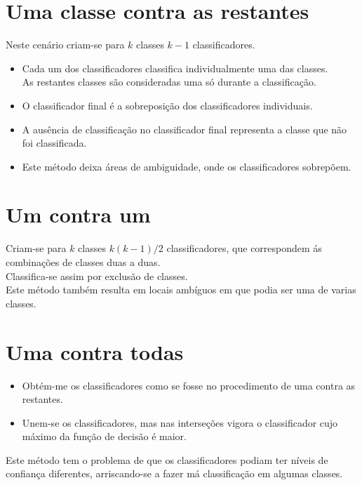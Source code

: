 \documentclass[]{report}
\begin{document}
\section{Uma classe contra as restantes}
Neste cenário criam-se para $k$ classes $k-1$ classificadores.
\begin{itemize}
\item Cada um dos classificadores classifica individualmente uma das classes.\\
As restantes classes são consideradas uma só durante a classificação.
\item O classificador final é a sobreposição dos classificadores individuais.
\item A ausência de classificação no classificador final representa a classe que não foi classificada.
\item Este método deixa áreas de ambiguidade, onde os classificadores sobrepõem.
\end{itemize}
\section{Um contra um}
Criam-se para $k$ classes $k(k-1)/2$ classificadores, que correspondem ás combinações de classes duas a duas.\\
Classifica-se assim por exclusão de classes.\\
Este método também resulta em locais ambíguos em que podia ser uma de varias classes.
\section{Uma contra todas}
\begin{itemize}
\item Obtém-me os classificadores como se fosse no procedimento de uma contra as restantes.
\item Unem-se os classificadores, mas nas interseções vigora o classificador cujo máximo da função de decisão é maior.
\end{itemize}
Este método tem o problema de que os classificadores podiam ter níveis de confiança diferentes, arriscando-se a fazer má classificação em algumas classes.
\end{document}
